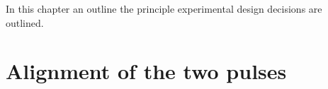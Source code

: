In this chapter an outline the principle experimental design decisions are outlined.



%









\section{Alignment of the two pulses}


